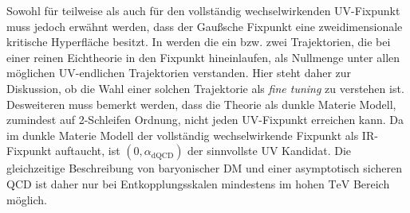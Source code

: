   Sowohl für teilweise als auch für den vollständig wechselwirkenden 
  UV-Fixpunkt muss jedoch erwähnt werden, dass der Gaußsche Fixpunkt eine 
  zweidimensionale kritische Hyperfläche besitzt. In \cite{Bond_Litim} werden die  
  ein bzw. zwei Trajektorien, die bei einer reinen Eichtheorie 
  in den 
  Fixpunkt 
  hineinlaufen, als Nullmenge unter allen möglichen UV-endlichen Trajektorien verstanden. 
  Hier steht daher zur Diskussion, ob die Wahl einer solchen Trajektorie als 
  \textit{fine tuning} zu verstehen ist. Desweiteren muss bemerkt werden, 
  dass die Theorie als dunkle Materie Modell, zumindest auf 2-Schleifen 
  Ordnung, nicht jeden UV-Fixpunkt erreichen kann. Da im dunkle Materie 
  Modell der vollständig wechselwirkende Fixpunkt als IR-Fixpunkt auftaucht, 
  ist $(0,\alpha_\text{dQCD})$ der sinnvollste UV Kandidat. Die gleichzeitige 
  Beschreibung von baryonischer DM und einer asymptotisch sicheren QCD 
  ist daher nur bei Entkopplungsskalen mindestens im hohen 
  $\text{TeV}$ Bereich möglich.
  
  